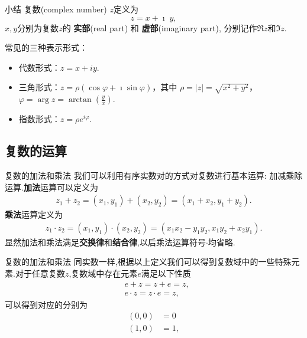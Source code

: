 \documentclass[fontset=windows, chinese, 10pt]{beamer}
\begin{document}
\begin{frame}{小结}
  复数(complex number) $z$定义为
  \begin{equation*}
    z = x + \imath \; y ,
\end{equation*}
$x,y$分别为复数$z$的 \textbf{实部}(real part) 和 \textbf{ 虚部}(imaginary part), 分别记作$\Re z$和$\Im z$.

常见的三种表示形式：
  \begin{itemize}
  \item 代数形式：\( z = x + iy \).
  \item 三角形式：\( z = \rho (\cos \varphi + \imath\sin \varphi) \)，其中 \(\rho = |z| = \sqrt{x^2 + y^2} \)，\( \varphi = \arg z = \arctan\left(\frac{y}{x}\right) \).
  \item 指数形式：\( z = \rho e^{i\varphi} \).
  \end{itemize}
  \end{frame}

  \subsection{复数的运算}

  \begin{frame}{复数的加法和乘法}
我们可以利用有序实数对的方式对复数进行基本运算: 加减乘除运算.{\bf 加法}运算可以定义为
\begin{align}
    z_1 + z_2 = (x_1, y_1) + (x_2, y_2) = (x_1 + x_2, y_1 + y_2) .
\end{align}
{\bf 乘法}运算定义为
\begin{align}
    z_1 \cdot z_2 = (x_1, y_1) \cdot (x_2, y_2) = (x_1 x_2 - y_1 y_2, x_1 y_2 + x_2 y_1) .
\end{align}
显然加法和乘法满足{\bf 交换律}和{\bf 结合律},以后乘法运算符号$\cdot$均省略.

  \end{frame}
  
  \begin{frame}{复数的加法和乘法}
    同实数一样,根据以上定义我们可以得到复数域中的一些特殊元素.对于任意复数$z$,复数域中存在元素$e$满足以下性质
    \begin{align}
        & e + z = z + e = z ,\\ 
        & e \cdot z = z \cdot e = z , 
    \end{align}
    可以得到对应的分别为
    \begin{align}
        (0, 0) &= 0\\
        (1, 0) &= 1 ,
    \end{align}
  \end{frame}
  
\end{document}
